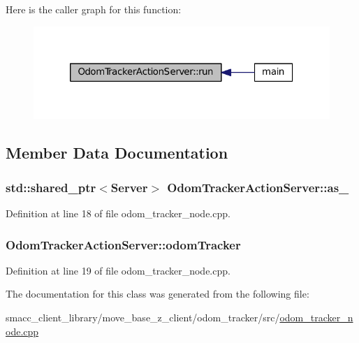 Here is the caller graph for this function\+:
\nopagebreak
\begin{figure}[H]
\begin{center}
\leavevmode
\includegraphics[width=320pt]{classOdomTrackerActionServer_a8ab6984c7383949a048d72437e9f79d3_icgraph}
\end{center}
\end{figure}




\subsection{Member Data Documentation}
\subsubsection[{\texorpdfstring{as\+\_\+}{as_}}]{\setlength{\rightskip}{0pt plus 5cm}std\+::shared\+\_\+ptr$<${\bf Server}$>$ Odom\+Tracker\+Action\+Server\+::as\+\_\+}\hypertarget{classOdomTrackerActionServer_a28bed1d95003d837b2b47053dbc66878}{}\label{classOdomTrackerActionServer_a28bed1d95003d837b2b47053dbc66878}


Definition at line 18 of file odom\+\_\+tracker\+\_\+node.\+cpp.

\subsubsection[{\texorpdfstring{odom\+Tracker}{odomTracker}}]{ Odom\+Tracker\+Action\+Server\+::odom\+Tracker}\hypertarget{classOdomTrackerActionServer_a3e5c4328d3206fbd2fd2708f0aefe651}{}\label{classOdomTrackerActionServer_a3e5c4328d3206fbd2fd2708f0aefe651}


Definition at line 19 of file odom\+\_\+tracker\+\_\+node.\+cpp.



The documentation for this class was generated from the following file\+:\begin{DoxyCompactItemize}
\item 
smacc\+\_\+client\+\_\+library/move\+\_\+base\+\_\+z\+\_\+client/odom\+\_\+tracker/src/\hyperlink{odom__tracker__node_8cpp}{odom\+\_\+tracker\+\_\+node.\+cpp}\end{DoxyCompactItemize}
